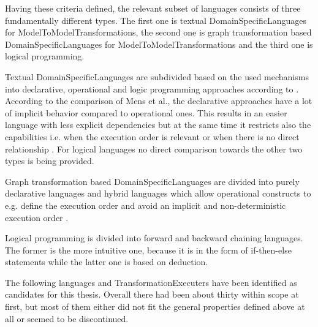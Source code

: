 Having these criteria defined, the relevant subset of languages consists of three fundamentally different types. The first one is textual \glspl{DomainSpecificLanguage} for \glspl{ModelToModelTransformation}, the second one is graph transformation based \glspl{DomainSpecificLanguage} for \glspl{ModelToModelTransformation} and the third one is logical programming. 

Textual \glspl{DomainSpecificLanguage} are subdivided based on the used mechanisms into declarative, operational and logic programming approaches according to \cite{Mens2006}. According to the comparison of Mens et al., the declarative approaches have a lot of implicit behavior compared to operational ones. This results in an easier language with less explicit dependencies but at the same time it restricts also the capabilities i.e. when the execution order is relevant or when there is no direct relationship \cite{Dvorak2008a}. For logical languages no direct comparison towards the other two types is being provided.

Graph transformation based \glspl{DomainSpecificLanguage} are divided into purely declarative languages and hybrid languages which allow operational constructs to e.g. define the execution order and avoid an implicit and non-deterministic execution order \cite{Detten2012}. 

Logical programming is divided into forward and backward chaining languages. The former is the more intuitive one, because it is in the form of if-then-else statements while the latter one is based on deduction.

The following languages and \glspl{TransformationExecuter} have been identified as candidates for this thesis. Overall there had been about thirty within scope at first, but most of them either did not fit the general properties defined above at all or seemed to be discontinued.


